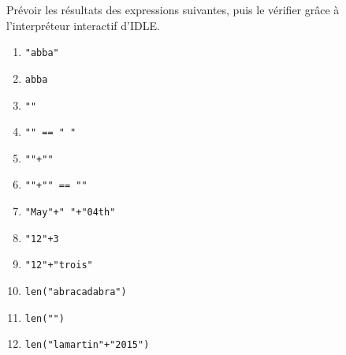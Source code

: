 \exer{}
\setcounter{numques}{0}

Prévoir les résultats des expressions suivantes, puis le vérifier grâce à l'interpréteur interactif d'IDLE.

  \begin{enumerate}[label=\emph{\alph*)}]
    \item \texttt{"abba"}
    \item \texttt{abba}
    \item \texttt{""}
    \item \texttt{"" == " "}
    \item \texttt{""+""}
    \item \texttt{""+"" == ""}
    \item \texttt{"May"+" "+"04th"}
    \item \texttt{"12"+3}
    \item \texttt{"12"+"trois"}
    \item \texttt{len("abracadabra")}
    \item \texttt{len("")}
    \item \texttt{len("lamartin"+"2015")}
  \end{enumerate}
